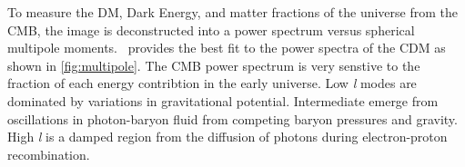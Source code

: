 \begin{figure}[ht]
\end{figure}

To measure the DM, Dark Energy, and matter fractions of the universe from the CMB, the image is deconstructed into a power spectrum versus spherical multipole moments.
\lcdm~provides the best fit to the power spectra of the CDM as shown in \cref{fig:multipole}.
The CMB power spectrum is very senstive to the fraction of each energy contribtion in the early universe.
Low \textit{l} modes are dominated by variations in gravitational potential.
Intermediate  emerge from oscillations in photon-baryon fluid from competing baryon pressures and gravity.
High \textit{l} is a damped region from the diffusion of photons during electron-proton recombination. \cite{Greene:cosmology_dm}

